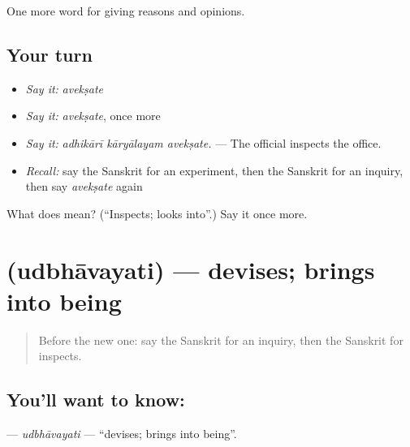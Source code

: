 \begin{grammarlens}[title={What you've built}]
One more word for giving reasons and opinions.
\end{grammarlens}

\subsection*{Your turn}
\begin{itemize}
\raggedright
  \item \emph{Say it:} \emph{avekṣate}
  \item \emph{Say it:} \emph{avekṣate}, once more
  \item \emph{Say it:} \emph{adhikārī kāryālayam avekṣate.} — The official inspects the office.
  \item \emph{Recall:} say the Sanskrit for an experiment, then the Sanskrit for an inquiry, then say \emph{avekṣate} again
\end{itemize}

\begin{tcolorbox}[breakable,colback=teal!4,colframe=teal!35!black,title={Before you move on}]
What does  mean? (\textquotedblleft{}Inspects; looks into\textquotedblright{}.) Say it once more.
\end{tcolorbox}
\section[\texorpdfstring{\sk{उद्भावयति} (udbhāvayati)}{उद्भावयति (udbhāvayati)}]{ (udbhāvayati) — devises; brings into being}

\label{lesson:SA-C362-udbhavayati}



\begin{quote}
Before the new one: say the Sanskrit for an inquiry, then the Sanskrit for inspects.
\end{quote}

\subsection*{You'll want to know: }
\textbf{} — \emph{udbhāvayati} — \textquotedblleft{}devises; brings into being\textquotedblright{}.

\begin{quote}
   
\end{quote}

